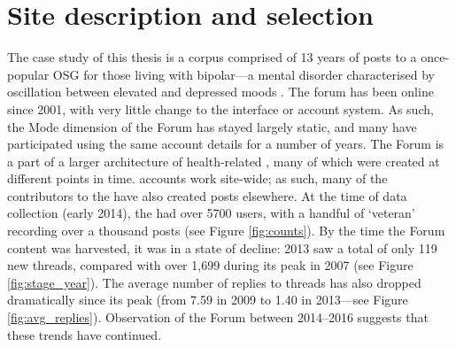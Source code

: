 
\section{Site description and selection}

The case study of this thesis is a \gls{corpus} comprised of 13 years of \glspl{post} to a once\hyp{}popular \gls{OSG} for those living with \gls{bipolar}---a mental disorder characterised by oscillation between elevated and depressed moods \cite{anderson_bipolar_2012}. The \gls{forum} has been online since 2001, with very little change to the interface or account system. As such, the \gls{Mode} dimension of the \gls{Forum} has stayed largely static, and many  have participated using the same account details for a number of years. The \gls{Forum} is a part of a larger architecture of health-related , many of which were created at different points in time.  accounts work site\hyp{}wide; as such, many of the contributors to the  have also created \glspl{post} elsewhere. At the time of data collection (early 2014), the  had over 5700 users, with a handful of `veteran'  recording over a thousand \glspl{post} (see Figure \ref{fig:counts}). By the time the \gls{Forum} content was harvested, it was in a state of decline: 2013 saw a total of only 119 new \glspl{thread}, compared with over 1,699 during its peak in 2007 (see Figure \ref{fig:stage_year}). The average number of replies to \glspl{thread} has also dropped dramatically since its peak (from 7.59 in 2009 to 1.40 in 2013---see Figure \ref{fig:avg_replies}). Observation of the \gls{Forum} between 2014--2016 suggests that these trends have continued.

